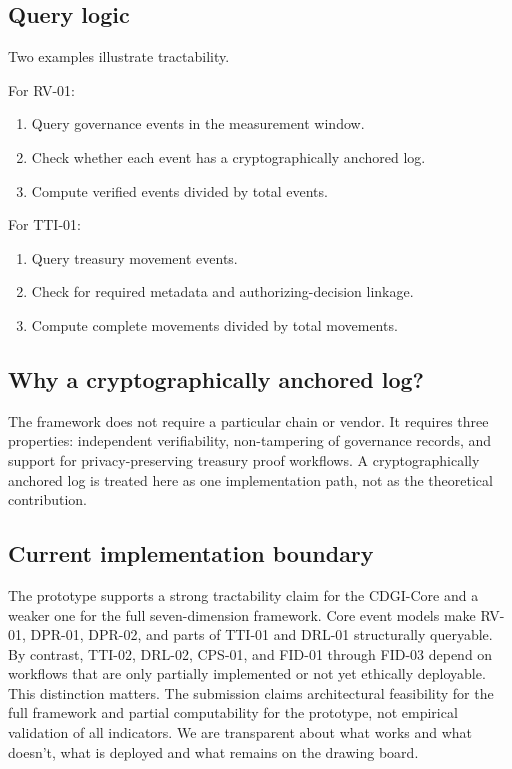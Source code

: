 \documentclass[sigconf,anonymous]{acmart}
\begin{document}
\subsection{Query logic}

Two examples illustrate tractability.

For RV-01:
\begin{enumerate}
\item Query governance events in the measurement window.
\item Check whether each event has a cryptographically anchored log.
\item Compute verified events divided by total events.
\end{enumerate}

For TTI-01:
\begin{enumerate}
\item Query treasury movement events.
\item Check for required metadata and authorizing-decision linkage.
\item Compute complete movements divided by total movements.
\end{enumerate}

\subsection{Why a cryptographically anchored log?}

The framework does not require a particular chain or vendor. It requires three properties: independent verifiability, non-tampering of governance records, and support for privacy-preserving treasury proof workflows. A cryptographically anchored log is treated here as one implementation path, not as the theoretical contribution.

\subsection{Current implementation boundary}

The prototype supports a strong tractability claim for the CDGI-Core and a weaker one for the full seven-dimension framework. Core event models make RV-01, DPR-01, DPR-02, and parts of TTI-01 and DRL-01 structurally queryable. By contrast, TTI-02, DRL-02, CPS-01, and FID-01 through FID-03 depend on workflows that are only partially implemented or not yet ethically deployable. This distinction matters. The submission claims architectural feasibility for the full framework and partial computability for the prototype, not empirical validation of all indicators. We are transparent about what works and what doesn’t, what is deployed and what remains on the drawing board.
\end{document}

